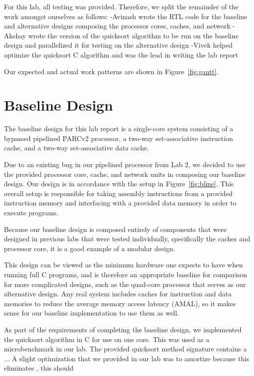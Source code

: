 \documentclass[10pt]{article}
\begin{document}
% 
For this lab, all testing was provided. Therefore, we split the remainder of the work amongst ourselves as follows:
-Avinash wrote the RTL code for the baseline and alternative designs composing the processor cores, caches, and network
-Akshay wrote the version of the quicksort algorithm to be run on the baseline design and parallelized it for testing on the alternative design
-Vivek helped optimize the quicksort C algorithm and was the lead in writing the lab report

Our expected and actual work patterns are shown in Figure~\ref{fig:gantt}.


\section{Baseline Design}

The baseline design for this lab report is a single-core system consisting of a bypassed pipelined PARCv2 
processor, a two-way set-associative instruction cache, and a two-way set-associative data cache. 

Due to an existing bug in our pipelined processor from Lab 2, we decided to use the provided processor core, 
cache, and network units in composing our baseline design. Our design is in accordance with the setup in 
Figure~\ref{fig:bline}. This overall setup is responsible for taking assembly instructions from a provided
instruction memory and interfacing with a provided data memory in order to execute programs.

Because our baseline design is composed entirely of components that were designed in previous labs that were 
tested individually, specifically the caches and processor core, it is a good example of a modular design. 

This design can be viewed as the minimum hardware one expects to have when running full C programs, and is therefore
an appropriate baseline for comparison for more complicated designs, such as the quad-core processor that serves as
our alternative design. Any real system includes caches for instruction and data memories to reduce the average memory
access latency (AMAL), so it makes sense for our baseline implementation to use them as well. 

As part of the requirements of completing the baseline design, we implemented the quicksort algorithm in C for use on
one core. This was used as a microbenchmark in our lab. The provided quicksort method signature contains a ...
A slight optimization that we provided in our lab was to amortize
because this eliminates , this should 
\end{document}
